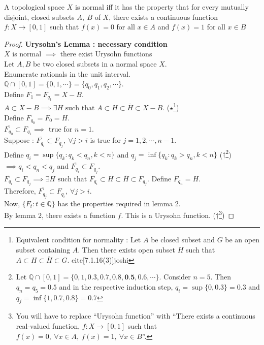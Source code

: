 \begin{theorem}
	A topological space $X$ is normal iff it has the property that for every mutually disjoint, closed subsets $A,\ B$ of $X$, there exists a continuous function \( f : X \to [0,1] \) such that \( f(x) = 0 \) for all $x \in A$ and \( f(x) = 1 \) for all \( x \in B \)
\end{theorem}
\begin{proof}
	\textbf{Urysohn's Lemma : necessary condition}\\
	$X$ is normal $\implies$ there exist Urysohn functions\\

	Let $A,B$ be two closed subsets in a normal space $X$.\\
	Enumerate rationals in the unit interval.\\
	$\mathbb{Q} \cap [0,1] = \{ 0, 1, \cdots \} = \{ q_0, q_1, q_2, \cdots \}$.\\
	Define $F_1 = F_{q_1} = X-B$. \\
	$A \subset X-B \implies\exists H \text{ such that } A \subset H \subset \overline{H} \subset X-B$.
	($\star$\footnote{Equivalent condition for normality : Let $A$ be closed subset and $G$ be an open subset containing $A$.
	Then there exists open subset $H$ such that $A \subset H \subset \overline{H} \subset G$.
	cite[7.1.16(3)]{joshi}})\\
	Define $F_{q_0} = F_0 = H$.\\

	$\overline{F_{q_0}} \subset F_{q_1} \implies $ true for $n = 1$.\\
	Suppose : $\overline{F_{q_i}} \subset F_{q_j},\ \forall j > i$ is true for $j = 1,2,\cdots,n-1$.\\
	Define $q_i = \sup \{ q_k : q_k < q_n, k < n \}$ and $q_j = \inf \{ q_k : q_k > q_n, k < n \}$ ($\dag$\footnote{ Let $\mathbb{Q}\cap[0,1] = \{ 0,1,0.3,0.7,0.8,\textbf{0.5},0.6,\cdots \}$.
	Consider $n = 5$.
	Then $q_n = q_5 = 0.5$ and in the respective induction step, $q_i = \sup\{0,0.3\} = 0.3$ and $q_j = \inf\{1,0.7,0.8\} = 0.7$}) \\
	$\implies q_i < q_n < q_j$ and $\overline{F_{q_i}} \subset F_{q_j}$.\\
	$\overline{F_{q_i}} \subset F_{q_j} \implies \exists H \text{ such that } \overline{F_{q_i}} \subset H \subset \overline{H} \subset F_{q_j}$.
	Define $F_{q_n} = H$.\\
	Therefore, $\overline{F_{q_j}} \subset F_{q_i},\ \forall j > i$.\\

	Now, $\{ F_t : t \in \mathbb{Q}\}$ has the properties required in lemma 2.\\
	By lemma 2, there exists a function $f$.
	This is a Urysohn function.
	($\dag$\footnote{You will have to replace ``Urysohn function'' with ``There exists a continuous real-valued function, $f : X \to [0,1]$ such that $f(x) = 0,\ \forall x \in A,\ f(x) = 1,\ \forall x \in B$''.})
\end{proof}


